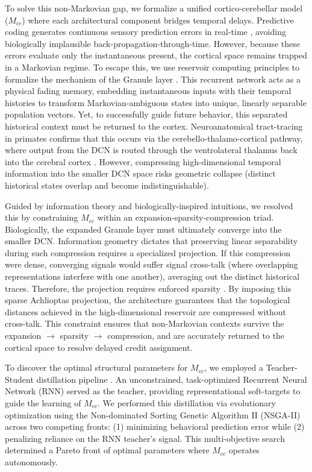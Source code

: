 \documentclass[12pt, a4paper]{extarticle}
\begin{document}
	To solve this non-Markovian gap, we formalize a unified cortico-cerebellar model ($M_{cc}$) where each architectural component bridges temporal delays. Predictive coding generates continuous sensory prediction errors in real-time \parencite{fristonPredictiveCodingFreeenergy2009}, avoiding biologically implausible back-propagation-through-time. However, because these errors evaluate only the instantaneous present, the cortical space remains trapped in a Markovian regime. To escape this, we use reservoir computing principles to formalize the mechanism of the Granule layer \parencite{maassLiquidStateMachine2002, hauserTheoreticalFoundationMorphological2011}. This recurrent network acts as a physical fading memory, embedding instantaneous inputs with their temporal histories to transform Markovian-ambiguous states into unique, linearly separable population vectors. Yet, to successfully guide future behavior, this separated historical context must be returned to the cortex. Neuroanatomical tract-tracing in primates confirms that this occurs via the cerebello-thalamo-cortical pathway, where output from the DCN is routed through the ventrolateral thalamus back into the cerebral cortex \parencite{kelly2003, bostan2013}. However, compressing high-dimensional temporal information into the smaller DCN space risks geometric collapse (distinct historical states overlap and become indistinguishable).
	
	Guided by information theory and biologically-inspired intuitions, we resolved this by constraining $M_{cc}$ within an expansion-sparsity-compression triad. Biologically, the expanded Granule layer must ultimately converge into the smaller DCN. Information geometry dictates that preserving linear separability during such compression requires a specialized projection. If this compression were dense, converging signals would suffer signal cross-talk (where overlapping representations interfere with one another), averaging out the distinct historical traces. Therefore, the projection requires enforced sparsity \parencite{achlioptasDatabasefriendlyRandomProjections2003}. By imposing this sparse Achlioptas projection, the architecture guarantees that the topological distances achieved in the high-dimensional reservoir are compressed without cross-talk. This constraint ensures that non-Markovian contexts survive the expansion $\rightarrow$ sparsity $\rightarrow$ compression, and are accurately returned to the cortical space to resolve delayed credit assignment.
	
	To discover the optimal structural parameters for $M_{cc}$, we employed a Teacher-Student distillation pipeline \parencite{hinton2015distilling}. An unconstrained, task-optimized Recurrent Neural Network (RNN) served as the teacher, providing representational soft-targets to guide the learning of $M_{cc}$. We performed this distillation via evolutionary optimization using the Non-dominated Sorting Genetic Algorithm II (NSGA-II) across two competing fronts: (1) minimizing behavioral prediction error while (2) penalizing reliance on the RNN teacher's signal. This multi-objective search determined a Pareto front of optimal parameters where $M_{cc}$ operates autonomously.
	
\end{document}
